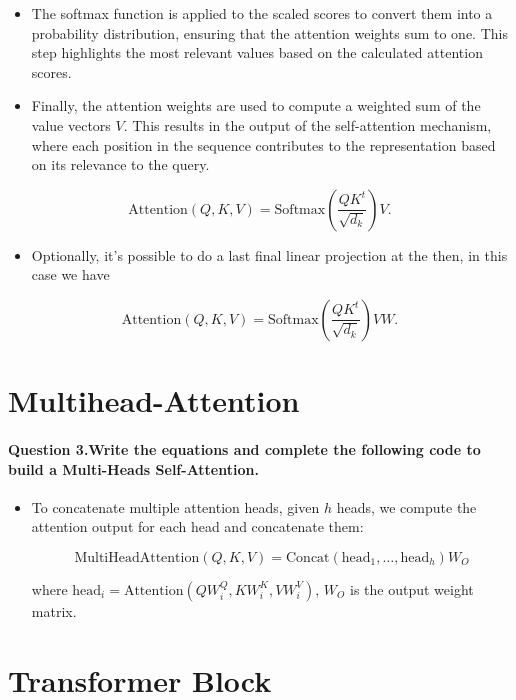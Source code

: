 \documentclass{article}
\begin{document}
\begin{itemize}
    \item The softmax  function is applied to the scaled scores to convert them into a probability distribution, ensuring that the attention weights sum to one. This step highlights the most relevant values based on the calculated attention scores.
\end{itemize}

\begin{itemize}
    \item Finally, the attention weights are used to compute a weighted sum of the value vectors $V$. This results in the output of the self-attention mechanism, where each position in the sequence contributes to the representation based on its relevance to the query.
\end{itemize}

\[
    \text{Attention}(Q, K, V) = \text{Softmax}\left(\frac{QK^t}{\sqrt{d_k}}\right)V
.\]

\begin{itemize}
    \item Optionally, it's possible to do a last final linear projection at the then, in this case we have
\end{itemize}
\[
    \text{Attention}(Q, K, V) = \text{Softmax}\left(\frac{QK^t}{\sqrt{d_k}}\right)V W
.\]

\section{Multihead-Attention}
\paragraph{Question 3.Write the equations and complete the following code to build a Multi-Heads Self-Attention.}

\begin{itemize}
    \item To concatenate multiple attention heads, given \( h \) heads, we compute the attention output for each head and concatenate them:

\[ \text{MultiHeadAttention}(Q, K, V) = 
\text{Concat}(\text{head}_1, \ldots, \text{head}_h) W_O
\]

where $\text{head}_i = \text{Attention}(QW_i^Q, KW_i^K, VW_i^V)$, $W_O$ is the output weight matrix.

\end{itemize}

\section{Transformer Block}
\end{document}
